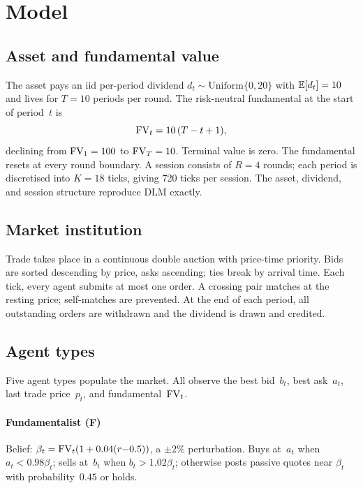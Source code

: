 \section{Model}
\label{sec:model}

\subsection{Asset and fundamental value}

The asset pays an iid per-period dividend
$d_t\sim\text{Uniform}\{0,20\}$ with $\mathbb{E}[d_t]=10$ and lives for
$T=10$ periods per round.  The risk-neutral fundamental at the start
of period~$t$ is
\begin{equation}
\mathrm{FV}_t = 10\,(T-t+1),
\label{eq:fv}
\end{equation}
declining from $\mathrm{FV}_1=100$ to $\mathrm{FV}_T=10$.  Terminal value is zero.
The fundamental resets at every round boundary.  A session consists of
$R=4$ rounds; each period is discretised into $K=18$ ticks, giving
720 ticks per session.  The asset, dividend, and session structure
reproduce DLM exactly.

\subsection{Market institution}

Trade takes place in a continuous double auction with price-time
priority.  Bids are sorted descending by price, asks ascending; ties
break by arrival time.  Each tick, every agent submits at most one
order.  A crossing pair matches at the resting price; self-matches are
prevented.  At the end of each period, all outstanding orders are
withdrawn and the dividend is drawn and credited.

\subsection{Agent types}

Five agent types populate the market.  All observe the best bid~$b_t$,
best ask~$a_t$, last trade price~$p_t$, and fundamental~$\mathrm{FV}_t$.

\paragraph{Fundamentalist (F)}
Belief: $\beta_t = \mathrm{FV}_t(1+0.04(r{-}0.5))$, a $\pm2\%$ perturbation.
Buys at~$a_t$ when $a_t<0.98\beta_t$; sells at~$b_t$ when
$b_t>1.02\beta_t$; otherwise posts passive quotes near $\beta_t$ with
probability~$0.45$ or holds.

